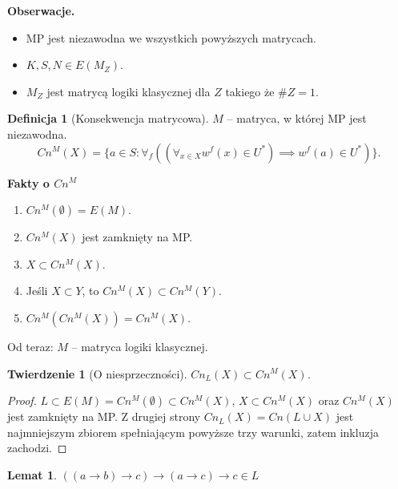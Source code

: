 \documentclass[10pt,a4paper]{article}
\theoremstyle{plain}
\newtheorem{theorem}{Twierdzenie}
\newtheorem{lemma}{Lemat}
\theoremstyle{definition}
\newtheorem*{definition}{Definicja}
\newcommand{\impl}{\rightarrow}
\newcommand{\header}[1]{\noindent\textbf{#1}}
\begin{document}
\header{Obserwacje.} 

\begin{itemize}
  \item MP jest niezawodna we wszystkich powyższych matrycach.
  \item $K,S,N \in E(M_Z)$.
  \item $M_Z$ jest matrycą logiki klasycznej dla $Z$ takiego że $\#Z=1$.
\end{itemize}

\begin{definition}[Konsekwencja matrycowa]
$M$ -- matryca, w której MP jest niezawodna.
$$Cn^M(X) = \{ a \in S : \forall_f 
  ((\forall_{x \in X} w^f(x) \in U^*) \implies w^f(a) \in U^*) \}.$$
\end{definition}

\header{Fakty o $Cn^M$}

\begin{enumerate}
  \item $Cn^M(\emptyset) = E(M)$.
  \item $Cn^M(X)$ jest zamknięty na MP.
  \item $X \subset Cn^M(X)$.
  \item Jeśli $X \subset Y$, to $Cn^M(X) \subset Cn^M(Y)$.
  \item $Cn^M(Cn^M(X)) = Cn^M(X)$.
\end{enumerate}

\noindent Od teraz: $M$ -- matryca logiki klasycznej.

\begin{theorem}[O niesprzeczności]
$Cn_L(X) \subset Cn^M(X)$.
\end{theorem}

\begin{proof}
$L \subset E(M) = Cn^M(\emptyset) \subset Cn^M(X)$, $X \subset Cn^M(X)$
oraz $Cn^M(X)$ jest zamknięty na MP. Z drugiej strony
$Cn_L(X) = Cn(L \cup X)$ jest najmniejszym zbiorem spełniającym powyższe
trzy warunki, zatem inkluzja zachodzi.
\end{proof}

\begin{lemma}
$((a \impl b) \impl c) \impl (a \impl c) \impl c \in L$
\end{lemma}
\end{document}
